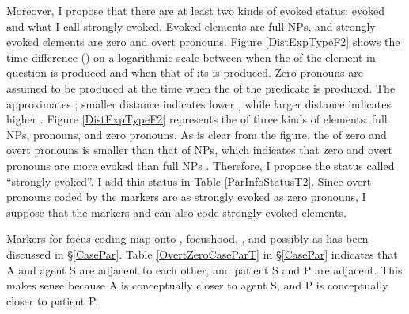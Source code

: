 Moreover,
I propose that there are at least two kinds of evoked status:
evoked and what I call strongly evoked.
Evoked elements are full NPs, and
strongly evoked elements are zero and overt pronouns.
Figure \ref{DistExpTypeF2} shows the time difference () on a logarithmic scale between when the  of the element in question is produced and when that of its  is produced.
Zero pronouns are assumed to be produced at the time when
the  of the predicate is produced.
The  approximates ;
smaller distance indicates lower ,
while larger distance indicates higher .
Figure \ref{DistExpTypeF2} represents the  of three kinds of elements:
full NPs, pronouns, and zero pronouns.
As is clear from the figure,
the  of zero and overt pronouns is smaller than
that of NPs,
which indicates that
zero and overt pronouns are more evoked than full NPs .
Therefore, I propose the status called ``strongly evoked''.
I add this status in Table \ref{ParInfoStatusT2}.
Since overt pronouns coded by the  markers are as strongly evoked as zero pronouns,
I suppose that the  markers  and  can also code strongly evoked elements.

Markers for focus coding map onto , focushood, , and possibly 
as has been discussed in \S \ref{CasePar}.
Table \ref{OvertZeroCaseParT} in \S \ref{CasePar} indicates that
A and agent S are adjacent to each other, and
patient S and P are adjacent.
This makes sense because
A is conceptually closer to agent S, and
P is conceptually closer to patient P.

